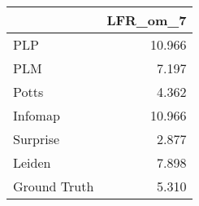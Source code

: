 \begin{tabular}{lr}
\toprule
{} & LFR_om_7 \\
\midrule
PLP          &   10.966 \\
PLM          &    7.197 \\
Potts        &    4.362 \\
Infomap      &   10.966 \\
Surprise     &    2.877 \\
Leiden       &    7.898 \\
Ground Truth &    5.310 \\
\bottomrule
\end{tabular}
